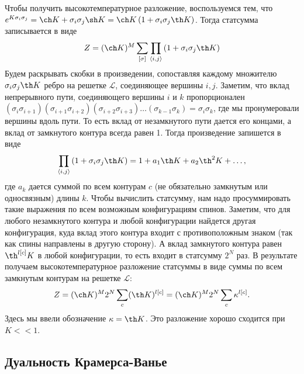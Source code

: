 \documentclass[a4paper,12pt]{article}
\theoremstyle{definition}
\theoremstyle{definition}
\theoremstyle{definition}
\begin{document}
Чтобы получить высокотемпературное разложение, воспользуемся тем, что $e^{K\sigma_i\sigma_j}=\ch
K+\sigma_i\sigma_j\sh K=\ch K \left(1+\sigma_i\sigma_j \th K\right)$. Тогда статсумма записывается в
виде 
\begin{equation}
  \label{eq:80}
  Z=(\ch K)^M\sum_{[\sigma]}\prod_{\left<i,j\right>}\left(1+\sigma_i \sigma_j \th K\right)
\end{equation}
Будем раскрывать скобки в произведении, сопоставляя каждому множителю $\sigma_i\sigma_j \th K$ ребро
на решетке $\mathcal{L}$, соединяющее вершины $i,j$. Заметим, что вклад непрерывного пути,
соединяющего вершины $i$ и $k$ пропорционален $(\sigma_i \sigma_{i+1}) (\sigma_{i+1}\sigma_{i+2})
(\sigma_{i+2}\sigma_{i+3})\dots (\sigma_{k-1}\sigma_k)=\sigma_{i}\sigma_k$, где мы пронумеровали
вершины вдоль пути. То есть вклад от незамкнутого пути дается его концами, а вклад от замкнутого
контура всегда равен 1.  Тогда произведение запишется в виде 
\begin{equation}
  \label{eq:107}
  \prod_{\left<i,j\right>}\left(1+\sigma_i \sigma_j \th K\right)=1+a_1 \th K +a_2 \th^2 K+\dots,
\end{equation}
где $a_k$ дается суммой по всем контурам $c$ (не обязательно замкнутым или односвязным) длины $k$. 
Чтобы вычислить статсумму, нам надо просуммировать такие выражения по всем возможным конфигурациям
спинов. Заметим, что для любого незамкнутого контура и любой конфигурации найдется другая
конфигурация, куда вклад этого контура входит с противоположным знаком (так как спины направлены в
другую сторону). А вклад замкнутого контура равен $\th^{l[c]}K$ в любой конфигурации, то есть входит
в статсумму $2^N$ раз. В результате получаем высокотемпературное разложение статсуммы в виде суммы
по всем замкнутым контурам на решетке $\mathcal{L}$: 
\begin{equation}
  \label{eq:108}
  Z=(\ch K)^M 2^N \sum_c (\th K)^{l[c]}=(\ch K)^M 2^N \sum_c \kappa^{l[c]}.
\end{equation}
Здесь мы ввели обозначение $\kappa=\th K$. Это разложение хорошо сходится при $K<<1$. 

\subsection{Дуальность Крамерса-Ванье}
\label{sec:duality}
\end{document}

